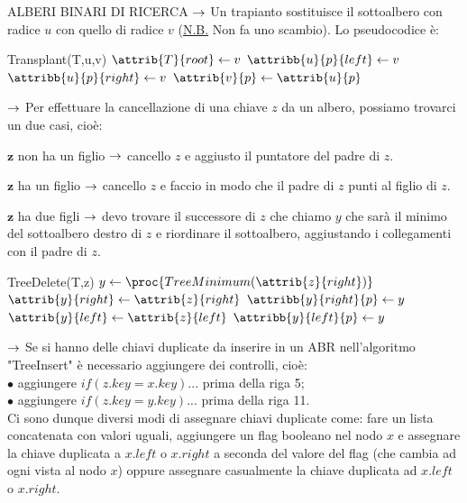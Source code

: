 \documentclass[8pt]{extarticle}
\begin{document}
\begin{formulario}
\begin{myParagraph}{ALBERI BINARI DI RICERCA}
 $\rightarrow$ Un trapianto sostituisce il sottoalbero con radice $u$ con quello di radice $v$ (\underline{N.B.} Non fa uno scambio). Lo pseudocodice è:
			\begin{code}{Transplant(T,u,v)}
\li {}
	\li $\attrib{T}{root}\la v$ 
\li {}
	\li $\attribb{u}{p}{left}\la v$
\li \ELSE $\attribb{u}{p}{right}\la v$
\END
\li {}
	\li $\attrib{v}{p}\la \attrib{u}{p}$
\END
			\end{code}
 $\rightarrow$ Per effettuare la cancellazione di una chiave $z$ da un albero, possiamo trovarci un due casi, cioè:
			\begin{descr}{1}
				\item[$\bm{z}$ non ha un figlio] $\rightarrow$ cancello $z$ e aggiusto il puntatore del padre di $z$.
				\item[$\bm{z}$ ha un figlio] $\rightarrow$ cancello $z$ e faccio in modo che il padre di $z$ punti al figlio di $z$.
				\item[$\bm{z}$ ha due figli] $\rightarrow$ devo trovare il successore di $z$ che chiamo $y$ che sarà il minimo del sottoalbero destro di $z$ e riordinare il sottoalbero, aggiustando i collegamenti con il padre di $z$.
			\end{descr}
			\begin{code}{TreeDelete(T,z)}
\li {}
	\li {}
\li {}
	\li {}
\li \ELSE 
	\li $y\la\proc{TreeMinimum(\attrib{z}{right})}$
	\li {}
		\li {}
		\li $\attrib{y}{right}\la\attrib{z}{right}$
		\li $\attribb{y}{right}{p}\la y$
	\END
	\li {}
	\li $\attrib{y}{left}\la\attrib{z}{left}$ 
	\li $\attribb{y}{left}{p}\la y$
\END
			\end{code}
 $\rightarrow$ Se si hanno delle chiavi duplicate da inserire in un ABR nell'algoritmo "TreeInsert" è necessario aggiungere dei controlli, cioè: \\
\qquad $\bullet$ aggiungere $if(z.key=x.key) ...$ prima della riga 5; \\
\qquad $\bullet$ aggiungere $if(z.key=y.key) ...$ prima della riga 11. \\
Ci sono dunque diversi modi di assegnare chiavi duplicate come: fare un lista concatenata con valori uguali, aggiungere un flag booleano nel nodo $x$ e assegnare la chiave duplicata a $x.left$ o $x.right$ a seconda del valore del flag (che cambia ad ogni vista al nodo $x$) oppure assegnare casualmente la chiave duplicata ad $x.left$ o $x.right$.\\

\end{myParagraph}
\end{formulario}
\end{document}
